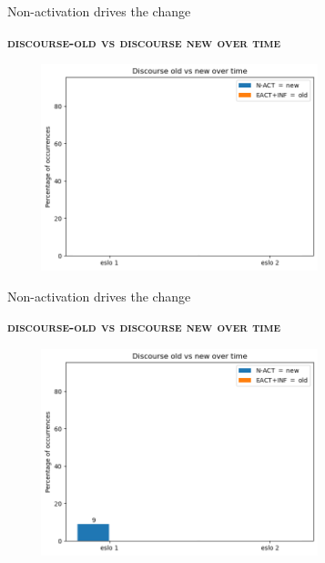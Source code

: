 \documentclass[lesson_slides]{subfiles}
\begin{document}
\begin{frame}[c]{Non-activation drives the change}

    \textbf{\textsc{discourse-old vs discourse new over time}}
    \begin{center}
        \includegraphics[width=10cm, height=6cm]{images/oldnew1empty.png}
    \end{center}
  
\end{frame}
\begin{frame}[c]{Non-activation drives the change}

    \textbf{\textsc{discourse-old vs discourse new over time}}
    \begin{center}
        \includegraphics[width=10cm, height=6cm]{images/oldnew1.png}
    \end{center}
  
\end{frame}
\end{document}
